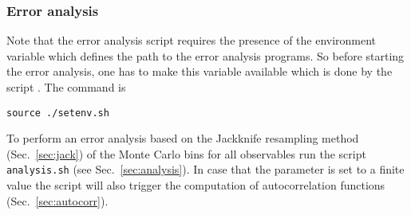 \subsubsection{Error analysis}
%
Note that the error analysis script requires the presence of the environment variable  which defines the path to the error analysis programs.
So before starting the error analysis, one has to make this variable available which is done by the script . The command is
\begin{verbatim}
source ./setenv.sh
\end{verbatim}
To perform an error analysis based on the Jackknife resampling method (Sec.~\ref{sec:jack})  of the Monte Carlo bins for all observables run the script \texttt{analysis.sh} 
(see Sec.~\ref{sec:analysis}). In case that the parameter  is set to a finite value the script will also trigger the computation of autocorrelation functions (Sec.~\ref{sec:autocorr}).

